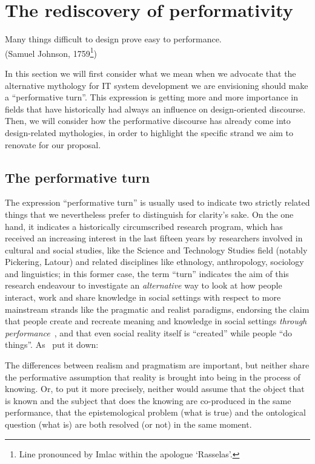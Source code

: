 \documentclass{article}
\let\origquotation\quotation
\let\endorigquotation\endquotation
\renewenvironment{quotation}{\vspace{-0.5\parskip}
  \origquotation
  \footnotesize
}{\endorigquotation}
\begin{document}
\section{The rediscovery of performativity}
\label{sec:performance}
\begin{quotation}
Many things difficult to design prove easy to performance.\\
(Samuel Johnson, 1759\footnote{Line pronounced by Imlac within the apologue `Rasselas'.})
\end{quotation}



In this section we will first consider what we mean when we advocate that the alternative mythology for IT system development we are envisioning should make a ``performative turn''. This expression is getting more and more importance in fields that have historically had always an influence on design-oriented discourse. Then, we will consider how the performative discourse has already come into design-related mythologies, in order to highlight the specific strand we aim to renovate for our proposal.

\subsection{The performative turn} 

The expression ``performative turn'' is usually used to indicate two strictly related things that we nevertheless prefer to distinguish for clarity's sake. On the one hand, it indicates a historically circumscribed research program, which has received an increasing interest in the last fifteen years by researchers involved in cultural and social studies, like the Science and Technology Studies field (notably Pickering, Latour) and related disciplines like ethnology, anthropology, sociology and linguistics; in this former case, the term ``turn'' indicates the aim of this research endeavour to investigate an \emph{alternative} way to look at how people interact, work and share knowledge in social settings with respect to more mainstream strands like the pragmatic and realist paradigms, endorsing the claim that people create and recreate meaning and knowledge in social settings \emph{through performance}~\citep{van_house_collocated_2009}, and that even social reality itself is ``created'' while people ``do things''. As~\citet{law_this_2003} put it down:

\begin{quotation}
The differences between realism and pragmatism are important, but neither share the performative
assumption that reality is brought into being in the process of knowing. Or, to
put it more precisely, neither would assume that the object that is known and the subject
that does the knowing are co-produced in the same performance, that the epistemological
problem (what is true) and the ontological question (what is) are both resolved (or not) in
the same moment.
\end{quotation}
\end{document}
